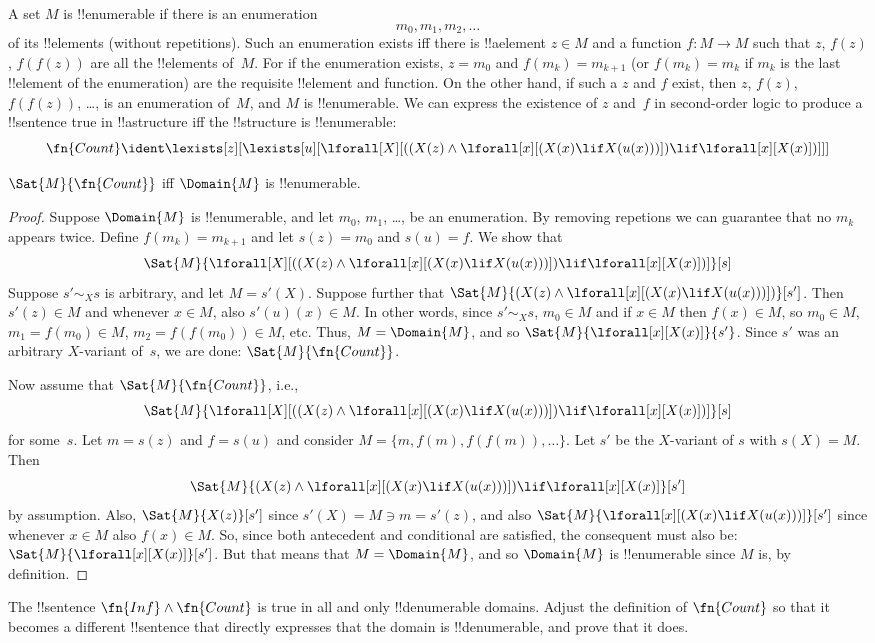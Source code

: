 \documentclass[../../../include/open-logic-section]{subfiles}
\begin{document}
A set $M$ is !!{enumerable} if there is an enumeration
\[
m_0, m_1, m_2, \dots
\]
of its !!{element}s (without repetitions).  Such an enumeration exists
iff there is !!a{element} $z \in M$ and a function $f\colon M \to M$
such that $z$, $f(z)$, $f(f(z))$ are all the !!{element}s of~$M$. For
if the enumeration exists, $z = m_0$ and $f(m_k) = m_{k+1}$ (or
$f(m_k) = m_k$ if $m_k$ is the last !!{element} of the enumeration)
are the requisite !!{element} and function. On the other hand, if such
a $z$ and $f$ exist, then $z$, $f(z)$, $f(f(z))$, \dots, is an
enumeration of~$M$, and $M$ is !!{enumerable}.  We can express the
existence of $z$ and~$f$ in second-order logic to produce a
!!{sentence} true in !!a{structure} iff the !!{structure} is
!!{enumerable}:
\[
\fn{Count} \ident
\lexists[z][\lexists[u][\lforall[X][((X(z) \land
      \lforall[x][(X(x) \lif X(u(x)))]) \lif \lforall[x][X(x)])]]]
\]

\begin{prop}
$\Sat{M}{\fn{Count}}$ iff $\Domain{M}$ is !!{enumerable}.
\end{prop}

\begin{proof}
Suppose $\Domain{M}$ is !!{enumerable}, and let $m_0$, $m_1$, \dots, be an
enumeration. By removing repetions we can guarantee that no $m_k$
appears twice. Define $f(m_k) = m_{k+1}$ and let $s(z) = m_0$ and
$s(u) = f$. We show that
\[
\Sat{M}{\lforall[X][((X(z) \land \lforall[x][(X(x) \lif X(u(x)))])
    \lif \lforall[x][X(x)])]}[s]
\]
Suppose $s' \sim_X s$ is arbitrary, and let $M = s'(X)$. Suppose
further that $\Sat{M}{(X(z) \land \lforall[x][(X(x) \lif
    X(u(x)))])}[s']$. Then $s'(z) \in M$ and whenever $x \in M$, also
$s'(u)(x) \in M$. In other words, since $s' \sim_X s$, $m_0 \in M$ and
if $x \in M$ then $f(x) \in M$, so $m_0 \in M$, $m_1 = f(m_0) \in M$,
$m_2 = f(f(m_0)) \in M$, etc. Thus, $M = \Domain{M}$, and so
$\Sat{M}{\lforall[x][X(x)]}{s'}$. Since $s'$ was an arbitrary
$X$-variant of~$s$, we are done: $\Sat{M}{\fn{Count}}$.

Now assume that $\Sat{M}{\fn{Count}}$, i.e., 
\[
\Sat{M}{\lforall[X][((X(z) \land \lforall[x][(X(x) \lif X(u(x)))])
    \lif \lforall[x][X(x)])]}[s]
\]
for some~$s$. Let $m = s(z)$ and $f = s(u)$ and consider $M = \{m,
f(m), f(f(m)), \dots\}$. Let $s'$ be the $X$-variant of $s$ with $s(X)
= M$. Then
\[
\Sat{M}{(X(z) \land \lforall[x][(X(x) \lif X(u(x)))])
    \lif \lforall[x][X(x)]}[s']
\]
by assumption. Also, $\Sat{M}{X(z)}[s']$ since $s'(X) = M \ni m =
s'(z)$, and also $\Sat{M}{\lforall[x][(X(x) \lif X(u(x)))]}[s']$ since
whenever $x \in M$ also $f(x) \in M$. So, since both antecedent and
conditional are satisfied, the consequent must also be:
$\Sat{M}{\lforall[x][X(x)]}[s']$. But that means that $M =
\Domain{M}$, and so $\Domain{M}$ is !!{enumerable} since $M$ is, by
definition.
\end{proof}

\begin{prob}
The !!{sentence} $\fn{Inf} \land \fn{Count}$ is true in all and only
!!{denumerable} domains.  Adjust the definition of $\fn{Count}$ so
that it becomes a different !!{sentence} that directly expresses that
the domain is !!{denumerable}, and prove that it does.
\end{prob}
\end{document}
